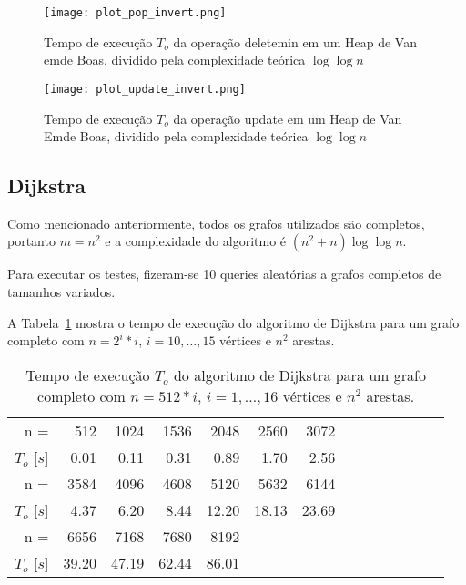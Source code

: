 \documentclass{article}
\begin{document}
\begin{figure}
  \centering
  \texttt{[image: plot\_pop\_invert.png]}
  \caption{Tempo de execução $T_o$ da operação deletemin em um Heap de Van emde Boas, dividido pela complexidade teórica $\log\log n$}
  \label{fig7}
\end{figure}

\begin{figure}
  \centering
  \texttt{[image: plot\_update\_invert.png]}
  \caption{Tempo de execução $T_o$ da operação update em um Heap de Van Emde Boas, dividido pela complexidade teórica $\log\log n$}
  \label{fig8}
\end{figure}

\subsection{Dijkstra}

Como mencionado anteriormente, todos os grafos utilizados são completos, portanto $m=n^2$ e a complexidade do algoritmo é $(n^2 + n) \log\log n$.

Para executar os testes, fizeram-se 10 queries aleatórias a grafos completos de tamanhos variados.

A Tabela~\ref{tab1} mostra o tempo de execução do algoritmo de Dijkstra para um grafo completo com $n=2^i * i$, $i=10,\ldots,15$ vértices e $n ^ 2$ arestas.


\begin{table}
  \centering
  \begin{tabular}{rrrrrrrrrrrrrr}
    \hline
    n =             & 512  & 1024 & 1536 & 2048 & 2560 & 3072        \\
    $T_o$ [$s$]     & 0.01 & 0.11 & 0.31 & 0.89 & 1.70 & 2.56     \\
    \hline
    n =             & 3584 & 4096  & 4608 & 5120  & 5632  & 6144  \\
    $T_o$ [$s$]     & 4.37 & 6.20  & 8.44 & 12.20 & 18.13 & 23.69 \\
    \hline
    n =             & 6656  & 7168  & 7680  & 8192  \\
    $T_o$ [$s$]     & 39.20 & 47.19 & 62.44 & 86.01 \\
    \hline
  \end{tabular}
  \caption{Tempo de execução $T_o$ do algoritmo de Dijkstra para um grafo completo com $n=512 * i$, $i=1,\ldots,16$ vértices e $n ^ 2$ arestas.}
  \label{tab1}
\end{table}
\end{document}
